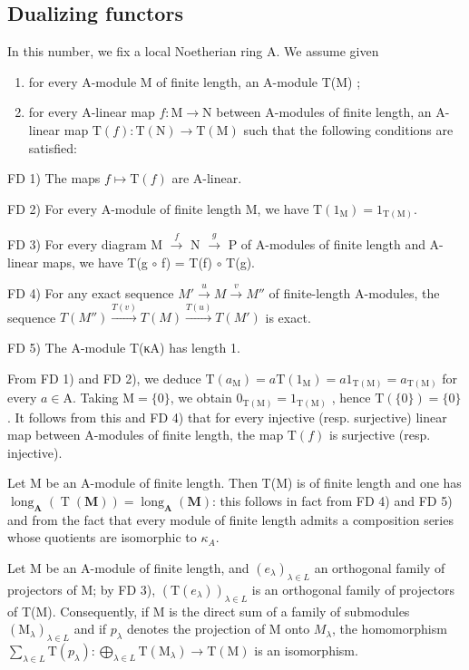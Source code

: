 \subsection{Dualizing functors}

In this number, we fix a local Noetherian ring A. We assume given

\begin{enumerate}
\def\labelenumi{\alph{enumi})}
\item
  for every A-module M of finite length, an A-module T(M) ;
\item
  for every A-linear map \(f: \mathrm{M} \to \mathrm{N}\) between A-modules of finite length, an A-linear map \(\mathrm{T}(f): \mathrm{T}(\mathrm{N}) \to \mathrm{T}(\mathrm{M})\) such that the following conditions are satisfied:
\end{enumerate}

FD 1) The maps \(f \mapsto \mathrm{T}(f)\) are A-linear.

FD 2) For every A-module of finite length M, we have \(\mathrm{T}(1_{\mathrm{M}}) = 1_{\mathrm{T(M)}}\).

FD 3) For every diagram M \(\xrightarrow{f}\) N \(\xrightarrow{g}\) P of A-modules of finite length and A-linear maps, we have T(g \(\circ\) f) = T(f) \(\circ\) T(g).

FD 4) For any exact sequence \(M' \xrightarrow{u} M \xrightarrow{v} M''\) of finite-length A-modules, the sequence \(T(M'') \xrightarrow{T(v)} T(M) \xrightarrow{T(u)} T(M')\) is exact.

FD 5) The A-module T(κA) has length 1.

From FD 1) and FD 2), we deduce \(\mathrm{T}(a_{\mathrm{M}}) = a\mathrm{T}(1_{\mathrm{M}}) = a1_{\mathrm{T(M)}} = a_{\mathrm{T(M)}}\) for every \(a \in \mathrm{A}\). Taking \(\mathrm{M} = \{0\}\), we obtain \(0_{\mathrm{T(M)}} = 1_{\mathrm{T(M)}}\) , hence \(\mathrm{T}(\{0\}) = \{0\}\). It follows from this and FD 4) that for every injective (resp. surjective) linear map between A-modules of finite length, the map \(\mathrm{T}(f)\) is surjective (resp. injective).

Let M be an A-module of finite length. Then T(M) is of finite length and one has \(\operatorname{long}_{\mathbf{A}}(\operatorname{T}(\mathbf{M})) = \operatorname{long}_{\mathbf{A}}(\mathbf{M})\): this follows in fact from FD 4) and FD 5) and from the fact that every module of finite length admits a composition series whose quotients are isomorphic to \(\kappa_{A}\).

Let M be an A-module of finite length, and \((e_{\lambda})_{\lambda \in L}\) an orthogonal family of projectors of M; by FD 3), \((\mathrm{T}(e_{\lambda}))_{\lambda \in L}\) is an orthogonal family of projectors of T(M). Consequently, if M is the direct sum of a family of submodules \((\mathrm{M}_{\lambda})_{\lambda \in L}\) and if \(p_{\lambda}\) denotes the projection of M onto \(M_{\lambda}\), the homomorphism \(\sum_{\lambda \in L} \mathrm{T}(p_{\lambda}) : \bigoplus_{\lambda \in L} \mathrm{T}(\mathrm{M}_{\lambda}) \longrightarrow \mathrm{T}(\mathrm{M})\) is an isomorphism.

